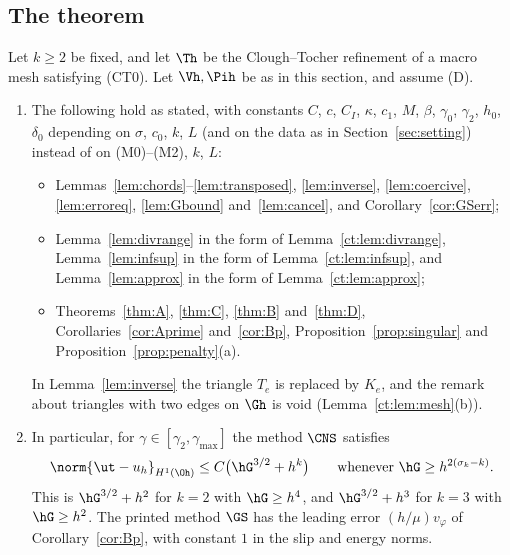 \subsection{The theorem}

\begin{theorem}\label{ct:thm:main}
Let $k\ge2$ be fixed, and let $\Th$ be the Clough--Tocher refinement of a macro mesh satisfying (CT0). Let $\Vh,\Pih$ be as in this section, and assume (D).
\begin{enumerate}[label=(\roman*)]
\item The following hold as stated, with constants $C$, $c$, $C_I$, $\kappa$, $c_1$, $M$, $\beta$, $\gamma_0$, $\gamma_2$, $h_0$, $\delta_0$ depending on $\sigma$, $c_0$, $k$, $L$ (and on the data as in Section~\ref{sec:setting}) instead of on (M0)--(M2), $k$, $L$:
\begin{itemize}
\item Lemmas~\ref{lem:chords}--\ref{lem:transposed}, \ref{lem:inverse}, \ref{lem:coercive}, \ref{lem:erroreq}, \ref{lem:Gbound} and~\ref{lem:cancel}, and Corollary~\ref{cor:GSerr};
\item Lemma~\ref{lem:divrange} in the form of Lemma~\ref{ct:lem:divrange}, Lemma~\ref{lem:infsup} in the form of Lemma~\ref{ct:lem:infsup}, and Lemma~\ref{lem:approx} in the form of Lemma~\ref{ct:lem:approx};
\item Theorems~\ref{thm:A}, \ref{thm:C}, \ref{thm:B} and~\ref{thm:D}, Corollaries~\ref{cor:Aprime} and~\ref{cor:Bp}, Proposition~\ref{prop:singular} and Proposition~\ref{prop:penalty}(a).
\end{itemize}
In Lemma~\ref{lem:inverse} the triangle $T_e$ is replaced by $K_e$, and the remark about triangles with two edges on $\Gh$ is void (Lemma~\ref{ct:lem:mesh}(b)).
\item In particular, for $\gamma\in[\gamma_2,\gamma_{\max}]$ the method $\CNS$ satisfies
\[
\norm{\ut-u_h}_{H^1(\Oh)}\le C\bigl(\hG^{3/2}+h^k\bigr)\qquad\text{whenever }\hG\ge h^{2(\sigma_k-k)} .
\]
This is $\hG^{3/2}+h^2$ for $k=2$ with $\hG\ge h^4$, and $\hG^{3/2}+h^3$ for $k=3$ with $\hG\ge h^2$. The printed method $\GS$ has the leading error $(h/\mu)v_\varphi$ of Corollary~\ref{cor:Bp}, with constant $1$ in the slip and energy norms.
\end{enumerate}
\end{theorem}

